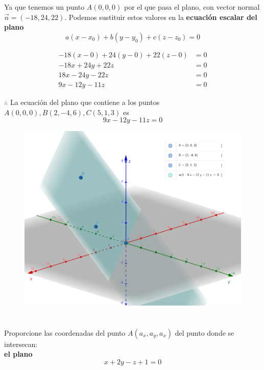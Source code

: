 \documentclass[12pt]{article}
\begin{document}
Ya que tenemos un punto $A(0,0,0)$ por el que pasa el plano, con vector normal $\vec{n}=(-18,24,22)$. Podemos sustituir estos valores en la \textbf{ecuación escalar del plano} $$a(x-x_0)+b(y-y_0)+c(z-z_0)=0$$

\begin{align*}
  -18(x-0)+24(y-0)+22(z-0)&=0 \\
  -18x+24y+22z&=0\\
  18x-24y-22z&=0\\
  9x-12y-11z&=0
\end{align*}

$\therefore$ La ecuación del plano que contiene a los puntos $A(0,0,0) , B(2,-4,6), C(5,1,3)$ es $$9x-12y-11z=0$$

\begin{figure}[H]
  \centering
  \includegraphics[width=1\textwidth]{./img/16_t1.png}
\end{figure}

\section{}

Proporcione las coordenadas del punto $A(a_x,a_y,a_x)$ del punto donde se intersecan: \\

\textbf{el plano} \\

\[ x + 2y -z+1 =0 \]
\end{document}
